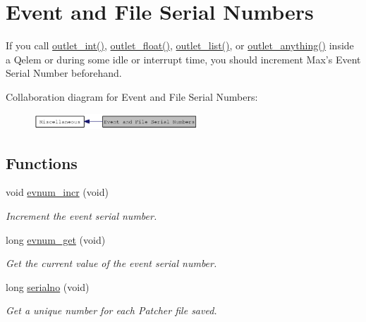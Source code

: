 \hypertarget{group__evnum}{
\section{Event and File Serial Numbers}
\label{group__evnum}
}


If you call \hyperlink{group__inout_ga0b2b38216f2f4dba486bfcd2273f255e}{outlet\_\-int()}, \hyperlink{group__inout_gafbb3f62a413f05a394391afde5b3c30f}{outlet\_\-float()}, \hyperlink{group__inout_gabdef4fbe6e1040dc28204b8070bdcda5}{outlet\_\-list()}, or \hyperlink{group__inout_ga12798ee897e01dac21ee547c4091d8a8}{outlet\_\-anything()} inside a Qelem or during some idle or interrupt time, you should increment Max’s Event Serial Number beforehand.  


Collaboration diagram for Event and File Serial Numbers:\nopagebreak
\begin{figure}[H]
\begin{center}
\leavevmode
\includegraphics[width=175pt]{group__evnum}
\end{center}
\end{figure}
\subsection*{Functions}
\begin{DoxyCompactItemize}
\item 
\hypertarget{group__evnum_gabe59d84de6401b7331a5cb12f8e16916}{
void \hyperlink{group__evnum_gabe59d84de6401b7331a5cb12f8e16916}{evnum\_\-incr} (void)}
\label{group__evnum_gabe59d84de6401b7331a5cb12f8e16916}

\begin{DoxyCompactList}\small\item\em Increment the event serial number. \item\end{DoxyCompactList}\item 
long \hyperlink{group__evnum_gad8e1d4214caa9159893347d0c1f6198e}{evnum\_\-get} (void)
\begin{DoxyCompactList}\small\item\em Get the current value of the event serial number. \item\end{DoxyCompactList}\item 
long \hyperlink{group__evnum_ga7e7dac31c7f482fec5bf64bf61cdc26b}{serialno} (void)
\begin{DoxyCompactList}\small\item\em Get a unique number for each Patcher file saved. \item\end{DoxyCompactList}\end{DoxyCompactItemize}


